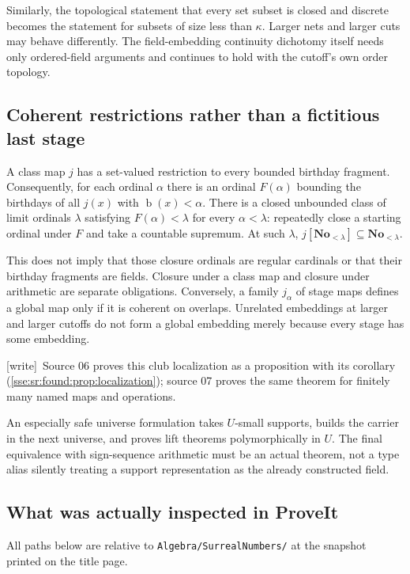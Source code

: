 \documentclass[11pt,a4paper]{article}
\numberwithin{equation}{section}
\theoremstyle{plain}
\theoremstyle{definition}
\theoremstyle{remark}
\newcommand{\No}{\mathbf{No}}
\newcommand{\bday}{\operatorname{b}}
\newcommand{\code}[1]{\texttt{\small #1}}
\newcommand{\wtag}{\textup{\textsf{[write]}}}%
\newenvironment{wnote}{\par\smallskip\noindent\wtag\ }{\par\smallskip}
\begin{document}
Similarly, the topological statement that every set subset is closed and
discrete becomes the statement for subsets of size less than $\kappa$.
Larger nets and larger cuts may behave differently. The field-embedding
continuity dichotomy itself needs only ordered-field arguments and
continues to hold with the cutoff's own order topology.

\subsection{Coherent restrictions rather than a fictitious last stage}
A class map $j$ has a set-valued restriction to every bounded birthday
fragment. Consequently, for each ordinal $\alpha$ there is an ordinal
$F(\alpha)$ bounding the birthdays of all $j(x)$ with $\bday(x)<\alpha$.
There is a closed unbounded class of limit ordinals $\lambda$ satisfying
$F(\alpha)<\lambda$ for every $\alpha<\lambda$: repeatedly close a starting
ordinal under $F$ and take a countable supremum. At such $\lambda$,
$j[\No_{<\lambda}]\subseteq\No_{<\lambda}$.

This does not imply that those closure ordinals are regular cardinals or
that their birthday fragments are fields. Closure under a class map and
closure under arithmetic are separate obligations. Conversely, a family
$j_\alpha$ of stage maps defines a global map only if it is coherent on
overlaps. Unrelated embeddings at larger and larger cutoffs do not form
a global embedding merely because every stage has some embedding.
\begin{wnote}Source 06 proves this club localization as a proposition with its corollary (\cref{sse:sr:found:prop:localization}); source 07 proves the same theorem for finitely many named maps and operations.\end{wnote}

An especially safe universe formulation takes $U$-small supports, builds
the carrier in the next universe, and proves lift theorems polymorphically
in $U$. The final equivalence with sign-sequence arithmetic must be an
actual theorem, not a type alias silently treating a support representation
as the already constructed field.

\subsection{What was actually inspected in ProveIt}
All paths below are relative to \code{Algebra/SurrealNumbers/} at the
snapshot printed on the title page.
\end{document}
